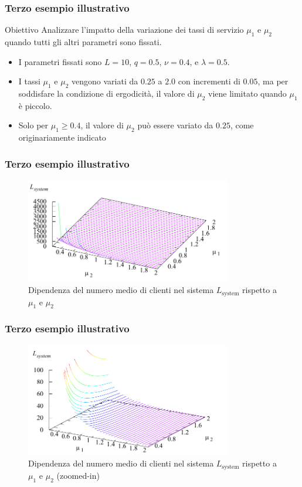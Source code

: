 \documentclass{beamer}
\begin{document}
\begin{frame}
    \frametitle{Terzo esempio illustrativo}
    \begin{block}{Obiettivo}
        Analizzare l'impatto della variazione dei tassi di servizio $\mu_1$ e $\mu_2$ quando tutti gli altri parametri sono fissati.
    \end{block}
    \begin{itemize}
        \item I parametri fissati sono $L=10$, $q=0.5$, $\nu=0.4$, e $\lambda=0.5$.
        \item I tassi $\mu_1$ e $\mu_2$ vengono variati da $0.25$ a $2.0$ con incrementi di $0.05$, ma per soddisfare la condizione di ergodicità, il valore di $\mu_2$ viene limitato quando $\mu_1$ è piccolo.
        \item Solo per $\mu_1\geq0.4$, il valore di $\mu_2$ può essere variato da $0.25$, come originariamente indicato
    \end{itemize}
\end{frame}


\begin{frame}
    \frametitle{Terzo esempio illustrativo}
    \begin{figure}[h]
        \centering
        \includegraphics[width=0.8\textwidth]{9LBRzWR.png}
        \caption{Dipendenza del numero medio di clienti nel sistema $L_{\mathrm{system}}$ rispetto a $\mu_1$ e $\mu_2$}
    \end{figure}
\end{frame}


\begin{frame}
    \frametitle{Terzo esempio illustrativo}
    \begin{figure}[h]
        \centering
        \includegraphics[width=0.8\textwidth]{CBOSr9C.png}
        \caption{Dipendenza del numero medio di clienti nel sistema $L_{\mathrm{system}}$ rispetto a $\mu_1$ e $\mu_2$ (zoomed-in)}
    \end{figure}
\end{frame}
\end{document}
